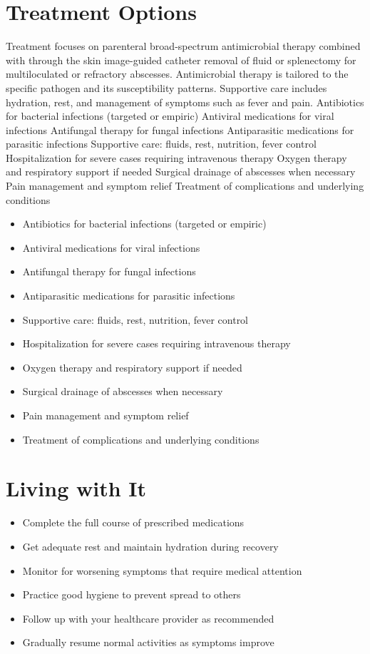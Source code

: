 \section{Treatment Options}
Treatment focuses on parenteral broad-spectrum antimicrobial therapy combined with through the skin image-guided catheter removal of fluid or splenectomy for multiloculated or refractory abscesses. Antimicrobial therapy is tailored to the specific pathogen and its susceptibility patterns. Supportive care includes hydration, rest, and management of symptoms such as fever and pain. Antibiotics for bacterial infections (targeted or empiric) Antiviral medications for viral infections Antifungal therapy for fungal infections Antiparasitic medications for parasitic infections Supportive care: fluids, rest, nutrition, fever control Hospitalization for severe cases requiring intravenous therapy Oxygen therapy and respiratory support if needed Surgical drainage of abscesses when necessary Pain management and symptom relief Treatment of complications and underlying conditions

\begin{itemize}[noitemsep]
  \item Antibiotics for bacterial infections (targeted or empiric)
  \item Antiviral medications for viral infections
  \item Antifungal therapy for fungal infections
  \item Antiparasitic medications for parasitic infections
  \item Supportive care: fluids, rest, nutrition, fever control
  \item Hospitalization for severe cases requiring intravenous therapy
  \item Oxygen therapy and respiratory support if needed
  \item Surgical drainage of abscesses when necessary
  \item Pain management and symptom relief
  \item Treatment of complications and underlying conditions
\end{itemize}
\section{Living with It}
\begin{itemize}[noitemsep]
  \item Complete the full course of prescribed medications
  \item Get adequate rest and maintain hydration during recovery
  \item Monitor for worsening symptoms that require medical attention
  \item Practice good hygiene to prevent spread to others
  \item Follow up with your healthcare provider as recommended
  \item Gradually resume normal activities as symptoms improve
\end{itemize}
